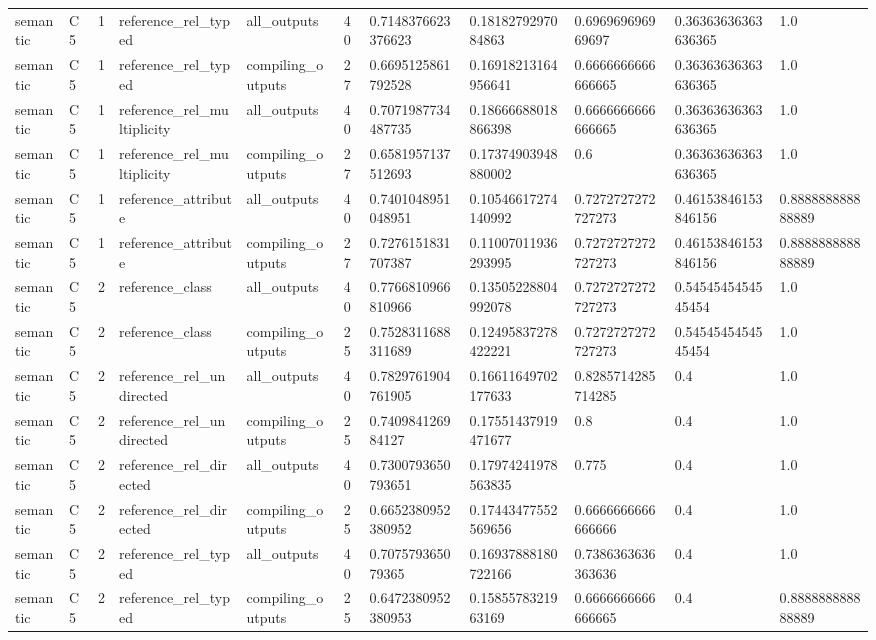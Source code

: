 \begin{tabular}{lllllllllll}
semantic & C5 & 1 & reference\_rel\_typed & all\_outputs & 40 & 0.7148376623376623 & 0.1818279297084863 & 0.696969696969697 & 0.36363636363636365 & 1.0 \\
semantic & C5 & 1 & reference\_rel\_typed & compiling\_outputs & 27 & 0.6695125861792528 & 0.16918213164956641 & 0.6666666666666665 & 0.36363636363636365 & 1.0 \\
semantic & C5 & 1 & reference\_rel\_multiplicity & all\_outputs & 40 & 0.7071987734487735 & 0.18666688018866398 & 0.6666666666666665 & 0.36363636363636365 & 1.0 \\
semantic & C5 & 1 & reference\_rel\_multiplicity & compiling\_outputs & 27 & 0.6581957137512693 & 0.17374903948880002 & 0.6 & 0.36363636363636365 & 1.0 \\
semantic & C5 & 1 & reference\_attribute & all\_outputs & 40 & 0.7401048951048951 & 0.10546617274140992 & 0.7272727272727273 & 0.46153846153846156 & 0.888888888888889 \\
semantic & C5 & 1 & reference\_attribute & compiling\_outputs & 27 & 0.7276151831707387 & 0.11007011936293995 & 0.7272727272727273 & 0.46153846153846156 & 0.888888888888889 \\
semantic & C5 & 2 & reference\_class & all\_outputs & 40 & 0.7766810966810966 & 0.13505228804992078 & 0.7272727272727273 & 0.5454545454545454 & 1.0 \\
semantic & C5 & 2 & reference\_class & compiling\_outputs & 25 & 0.7528311688311689 & 0.12495837278422221 & 0.7272727272727273 & 0.5454545454545454 & 1.0 \\
semantic & C5 & 2 & reference\_rel\_undirected & all\_outputs & 40 & 0.7829761904761905 & 0.16611649702177633 & 0.8285714285714285 & 0.4 & 1.0 \\
semantic & C5 & 2 & reference\_rel\_undirected & compiling\_outputs & 25 & 0.740984126984127 & 0.17551437919471677 & 0.8 & 0.4 & 1.0 \\
semantic & C5 & 2 & reference\_rel\_directed & all\_outputs & 40 & 0.7300793650793651 & 0.17974241978563835 & 0.775 & 0.4 & 1.0 \\
semantic & C5 & 2 & reference\_rel\_directed & compiling\_outputs & 25 & 0.6652380952380952 & 0.17443477552569656 & 0.6666666666666666 & 0.4 & 1.0 \\
semantic & C5 & 2 & reference\_rel\_typed & all\_outputs & 40 & 0.707579365079365 & 0.16937888180722166 & 0.7386363636363636 & 0.4 & 1.0 \\
semantic & C5 & 2 & reference\_rel\_typed & compiling\_outputs & 25 & 0.6472380952380953 & 0.1585578321963169 & 0.6666666666666665 & 0.4 & 0.888888888888889 \\

\end{tabular}
